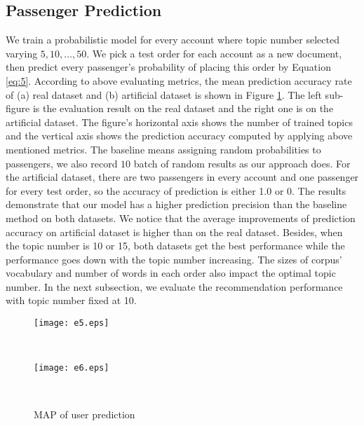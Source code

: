 \documentclass{llncs}
\begin{document}
\subsection{Passenger Prediction}
We train a probabilistic model for every account where topic number selected varying ${5,10,\dots,50}$. We pick a test order for each account as a new document, then predict every passenger's probability of placing this order by Equation \ref{eq:5}. According to above evaluating metrics, the mean prediction accuracy rate of (a) real dataset and (b) artificial dataset is shown in Figure \ref{fig:pred}. The left sub-figure is the evaluation result on the real dataset and the right one is on the artificial dataset. The figure's horizontal axis shows the number of trained topics and the vertical axis shows the prediction accuracy computed by applying above mentioned metrics. The baseline means assigning random probabilities to passengers, we also record $10$ batch of random results as our approach does. For the artificial dataset, there are two passengers in every account and one passenger for every test order, so the accuracy of prediction is either 1.0 or 0. The results demonstrate that our model has a higher prediction precision than the baseline method on both datasets. We notice that the average improvements of prediction accuracy on artificial dataset is higher than on the real dataset. Besides, when the topic number is 10 or 15, both datasets get the best performance while the performance goes down with the topic number increasing. The sizes of corpus' vocabulary and number of words in each order also impact the optimal topic number. In the next subsection, we evaluate the recommendation performance with topic number fixed at 10.\par 

\begin{figure}[!h]
              \begin{minipage}[t]{0.47\linewidth}
              \centering
              \texttt{[image: e5.eps]}\\
              \end{minipage}
              \begin{minipage}[t]{0.005\linewidth}~~~
              \end{minipage}
              \begin{minipage}[t]{0.47\linewidth}
              \centering
              \texttt{[image: e6.eps]}\\
              \end{minipage}
              \begin{minipage}[t]{0.005\linewidth}~~~
              \end{minipage}
              \caption{MAP of user prediction}
          \label{fig:pred}
\end{figure}
\end{document}
